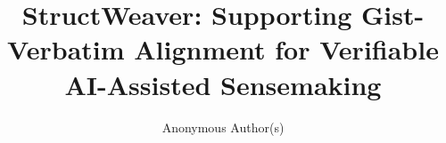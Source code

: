 \documentclass[manuscript,review,anonymous]{acmart}
\begin{document}

\title{StructWeaver: Supporting Gist-Verbatim Alignment for Verifiable AI-Assisted Sensemaking}

\author{Anonymous Author(s)}

\renewcommand{\shortauthors}{Anonymous Author(s)}


\end{document}
